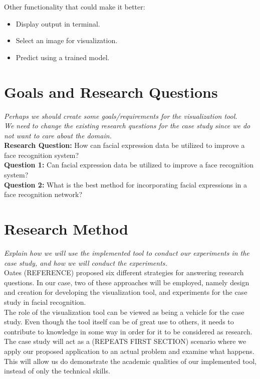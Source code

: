 \noindent Other functionality that could make it better:
\begin{itemize}
    \item Display output in terminal.
    \item Select an image for visualization.
    \item Predict using a trained model.
\end{itemize}

\section{Goals and Research Questions}

\textit{Perhaps we should create some goals/requirements for the visualization tool. \\
We need to change the existing research questions for the case study since we do not want to care about the domain.}\\

\noindent\textbf{Research Question:} How can facial expression data be utilized to improve a face recognition system? \\

\noindent\textbf{Question 1:} Can facial expression data be utilized to improve a face recognition system? \\
\noindent\textbf{Question 2:} What is the best method for incorporating facial expressions in a face recognition network?

\section{Research Method}

\textit{Explain how we will use the implemented tool to conduct our experiments in the case study, and how we will conduct the experiments.} \\

\noindent Oates (REFERENCE) proposed six different strategies for answering research questions. In our case, two of these approaches will be employed, namely design and creation for developing the visualization tool, and experiments for the case study in facial recognition. \\

\noindent The role of the visualization tool can be viewed as being a vehicle for the case study. Even though the tool itself can be of great use to others, it needs to contribute to knowledge in some way in order for it to be considered as research. The case study will act as a (REPEATS FIRST SECTION) scenario where we apply our proposed application to an actual problem and examine what happens. This will allow us do demonstrate the academic qualities of our implemented tool, instead of only the technical skills. \\

